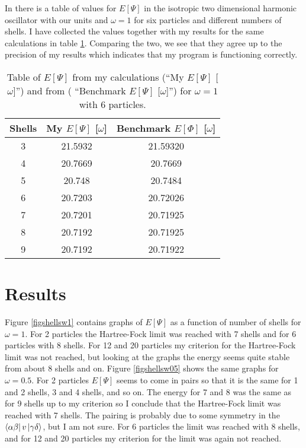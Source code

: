 \documentclass[a4paper,english,12pt]{article}
\begin{document}
In \cite{mortenslides} there is a table of values for $E[\Psi]$ in the isotropic two dimensional harmonic oscillator with our units and $\omega = 1$
for six particles and different numbers of shells. I have collected the values together with my results for the same calculations in table \ref{tabbench}.
Comparing the two, we see that they agree up to the precision of my results which indicates that my program is functioning correctly.


\begin{table}
  \caption{Table of $E[\Psi]$ from my calculations (``My $E[\Psi]$ [$\omega$]'') and from \cite{mortenslides} ( ``Benchmark $E[\Psi]$ [$\omega$]'') for $\omega = 1$ with 6 particles.}\label{tabbench}
  \begin{center}
    \begin{tabular}{*{3}{c}}
      Shells &  My $E[\Psi]$ [$\omega$] & Benchmark $E[\Phi]$ [$\omega$]   \\
      \hline
      3&21.5932&21.59320\\
      4&20.7669&20.7669\\
      5&20.748&20.7484\\
      6&20.7203&20.72026\\
      7&20.7201&20.71925\\
      8&20.7192&20.71925\\
      9&20.7192&20.71922
    \end{tabular}
  \end{center}
\end{table}



\section{Results}



Figure \ref{figshellsw1} contains graphs of $E[\Psi]$ as a function of number of shells for $\omega = 1$.
For 2 particles the Hartree-Fock limit was reached with 7 shells and for 6 particles with 8 shells.
For 12 and 20 particles my criterion for the Hartree-Fock limit was not reached, but looking at the graphs the energy seems
quite stable from about 8 shells and on.
Figure \ref{figshellsw05} shows the same graphs for $\omega = 0.5$.
For 2 particles $E[\Psi]$ seems to come in pairs so that it is the same for 1 and 2 shells, 3 and 4 shells, and so on.
The energy for 7 and 8 was the same as for 9 shells up to my criterion so I conclude that the Hartree-Fock limit was reached with 7 shells.
The pairing is probably due to some symmetry in the $\bra{\alpha\beta}v\ket{\gamma\delta}$, but I am not sure.
For 6 particles the limit was reached with 8 shells, and for 12 and 20 particles my criterion for the limit was again not reached.
\end{document}
